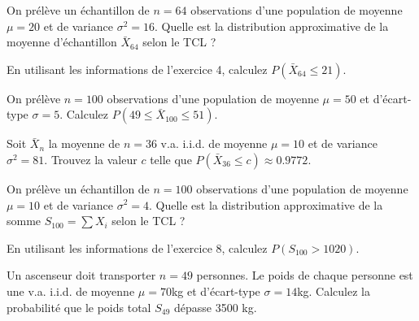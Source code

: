 
\begin{exercicebox}
On prélève un échantillon de $n=64$ observations d'une population de moyenne $\mu=20$ et de variance $\sigma^2=16$.
Quelle est la distribution approximative de la moyenne d'échantillon $\bar{X}_{64}$ selon le TCL ?
\end{exercicebox}

\begin{exercicebox}
En utilisant les informations de l'exercice 4, calculez $P(\bar{X}_{64} \le 21)$.
\end{exercicebox}

\begin{exercicebox}
On prélève $n=100$ observations d'une population de moyenne $\mu=50$ et d'écart-type $\sigma=5$.
Calculez $P(49 \le \bar{X}_{100} \le 51)$.
\end{exercicebox}

\begin{exercicebox}
Soit $\bar{X}_n$ la moyenne de $n=36$ v.a. i.i.d. de moyenne $\mu=10$ et de variance $\sigma^2=81$.
Trouvez la valeur $c$ telle que $P(\bar{X}_{36} \le c) \approx 0.9772$.
\end{exercicebox}


\begin{exercicebox}
On prélève un échantillon de $n=100$ observations d'une population de moyenne $\mu=10$ et de variance $\sigma^2=4$.
Quelle est la distribution approximative de la somme $S_{100} = \sum X_i$ selon le TCL ?
\end{exercicebox}

\begin{exercicebox}
En utilisant les informations de l'exercice 8, calculez $P(S_{100} > 1020)$.
\end{exercicebox}

\begin{exercicebox}
Un ascenseur doit transporter $n=49$ personnes. Le poids de chaque personne est une v.a. i.i.d. de moyenne $\mu=70$kg et d'écart-type $\sigma=14$kg.
Calculez la probabilité que le poids total $S_{49}$ dépasse 3500 kg.
\end{exercicebox}

